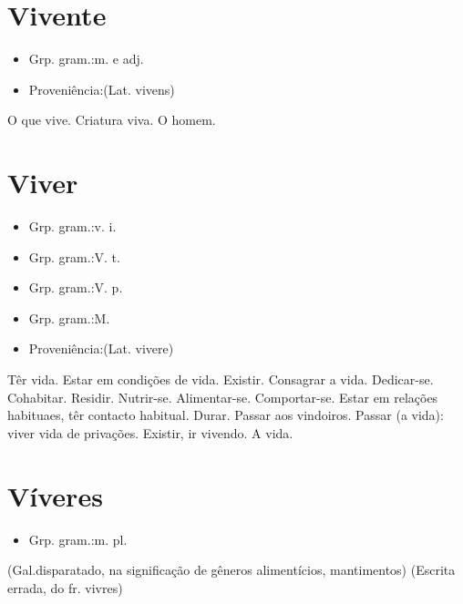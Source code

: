\documentclass{article}
\begin{document}
\section{Vivente}
\begin{itemize}
\item {Grp. gram.:m.  e  adj.}
\end{itemize}
\begin{itemize}
\item {Proveniência:(Lat. \textunderscore vivens\textunderscore )}
\end{itemize}
O que vive.
Criatura viva.
O homem.
\section{Viver}
\begin{itemize}
\item {Grp. gram.:v. i.}
\end{itemize}
\begin{itemize}
\item {Grp. gram.:V. t.}
\end{itemize}
\begin{itemize}
\item {Grp. gram.:V. p.}
\end{itemize}
\begin{itemize}
\item {Grp. gram.:M.}
\end{itemize}
\begin{itemize}
\item {Proveniência:(Lat. \textunderscore vivere\textunderscore )}
\end{itemize}
Têr vida.
Estar em condições de vida.
Existir.
Consagrar a vida.
Dedicar-se.
Cohabitar.
Residir.
Nutrir-se.
Alimentar-se.
Comportar-se.
Estar em relações habituaes, têr contacto habitual.
Durar.
Passar aos vindoiros.
Passar (a vida): \textunderscore viver vida de privações\textunderscore .
Existir, ir vivendo.
A vida.
\section{Víveres}
\begin{itemize}
\item {Grp. gram.:m. pl.}
\end{itemize}
(\textunderscore Gal.\textunderscore  disparatado, na significação de gêneros alimentícios, mantimentos)
(Escrita errada, do fr. \textunderscore vivres\textunderscore )
\end{document}

